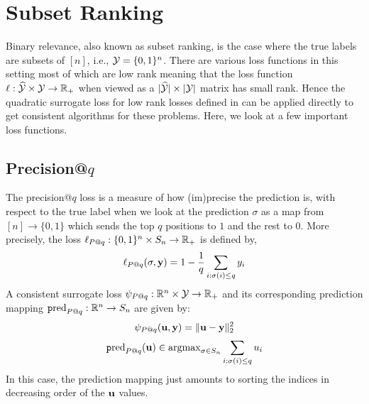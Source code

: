 \section{Subset Ranking}\label{sec:binary-relevance}
Binary relevance, also known as subset ranking, is the case where the true labels are subsets of $[n]$, i.e., ${\mathcal Y} = \{0,1\}^n$. There are various loss functions in this setting most of which are low rank meaning that the loss function $\ell:\widehat{\mathcal{Y}} \times {\mathcal Y} \to {\mathbb R}_+$ when viewed as a $|\widehat{\mathcal{Y}}|\times|{\mathcal Y}|$ matrix has small rank. Hence the quadratic surrogate loss for low rank losses defined in \cite{ramaswamy2013convex} can be applied directly to get consistent algorithms for these problems. Here, we look at a few important loss functions.

\subsection{Precision@$q$}
The precision@$q$ loss is a measure of how (im)precise the prediction is, with respect to the true label when we look at the prediction $\sigma$ as a map from $[n] \to \{0,1\}$ which sends the top $q$ positions to $1$ and the rest to $0$. More precisely, the loss $\ell_{P@q}: \{0,1\}^n \times S_n\to {\mathbb R}_+$ is defined by,
$$\ell_{P@q}(\sigma,{\mathbf y}) = 1 - \frac{1}{q}\sum_{i:\sigma(i)\leq q}y_i$$
A consistent surrogate loss $\psi_{P@q}:{\mathbb R}^n \times {\mathcal Y} \to {\mathbb R}_+$ and its corresponding prediction mapping $\text{\texttt pred}_{P@q}:{\mathbb R}^n \to S_n$ are given by:
$$\psi_{P@q}({\mathbf u},{\mathbf y}) = \lVert {\mathbf u} - {\mathbf y} \rVert_2^2$$
$$\text{\texttt pred}_{P@q}({\mathbf u}) \in \textup{\textrm{argmax}}_{\sigma\in S_n}\sum_{i:\sigma(i)\leq q}u_i$$
In this case, the prediction mapping just amounts to sorting the indices in decreasing order of the ${\mathbf u}$ values. 

